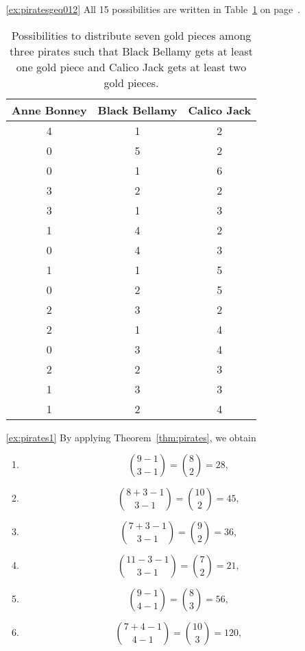 \begin{enumerate}
\item[\ref{ex:piratesgeq012}]
All 15 possibilities are written in Table~\ref{tab:piratesgeq012} on page~\pageref{tab:piratesgeq012}. 
\begin{table}[!htb]
\caption{Possibilities to distribute seven gold pieces among three pirates such that Black Bellamy gets at least one gold piece and Calico Jack gets at least two gold pieces.}\label{tab:piratesgeq012}
\begin{center}
\begin{tabular}{|c|c|c|}
\hline
Anne Bonney & Black Bellamy & Calico Jack \\
\hline
\hline
4 & 1 & 2 \\
0 & 5 & 2 \\
0 & 1 & 6 \\
3 & 2 & 2 \\
3 & 1 & 3 \\
1 & 4 & 2 \\
0 & 4 & 3 \\
1 & 1 & 5 \\
0 & 2 & 5 \\
2 & 3 & 2 \\
2 & 1 & 4 \\
0 & 3 & 4 \\
2 & 2 & 3 \\
1 & 3 & 3 \\
1 & 2 & 4 \\
\hline
\end{tabular}
\end{center}
\end{table}

\item[\ref{ex:pirates1}]
By applying Theorem~\ref{thm:pirates}, 
we obtain
\begin{enumerate}
\item
\[
\binom{9 - 1}{3 - 1} = \binom{8}{2} = 28, 
\]

\item
\[
\binom{8+3 - 1}{3 - 1} = \binom{10}{2} = 45, 
\]

\item
\[
\binom{7+3 - 1}{3 - 1} = \binom{9}{2} = 36, 
\]

\item
\[
\binom{11-3 - 1}{3 - 1} = \binom{7}{2} = 21, 
\]

\item
\[
\binom{9 - 1}{4 - 1} = \binom{8}{3} = 56, 
\]

\item
\[
\binom{7+4 - 1}{4 - 1} = \binom{10}{3} = 120, 
\]


\end{enumerate}
\end{enumerate}
